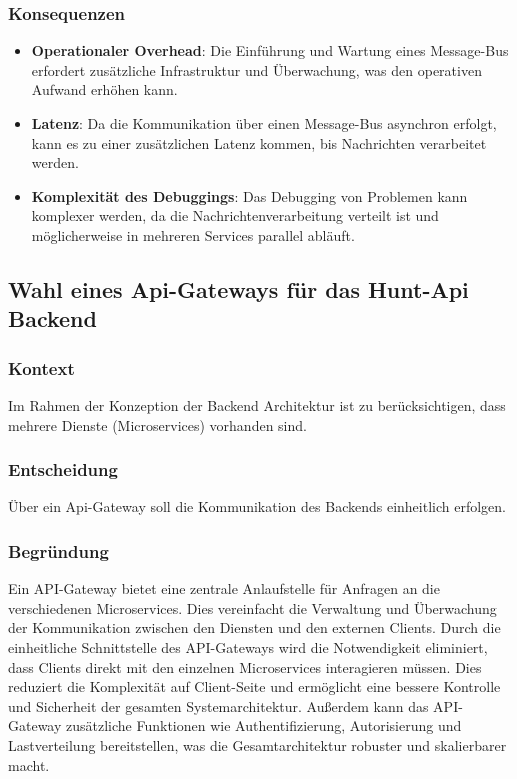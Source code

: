 \subsubsection{Konsequenzen}

\begin{itemize}
    \item \textbf{Operationaler Overhead}: Die Einführung und Wartung eines Message-Bus erfordert zusätzliche Infrastruktur und Überwachung, was den operativen Aufwand erhöhen kann.
    \item \textbf{Latenz}: Da die Kommunikation über einen Message-Bus asynchron erfolgt, kann es zu einer zusätzlichen Latenz kommen, bis Nachrichten verarbeitet werden.
    \item \textbf{Komplexität des Debuggings}: Das Debugging von Problemen kann komplexer werden, da die Nachrichtenverarbeitung verteilt ist und möglicherweise in mehreren Services parallel abläuft.
\end{itemize}

\subsection{Wahl eines Api-Gateways für das Hunt-Api Backend} \label{appendix:adr:proxy}

\subsubsection{Kontext}

Im Rahmen der Konzeption der Backend Architektur ist zu berücksichtigen, dass mehrere Dienste (Microservices) vorhanden sind.

\subsubsection{Entscheidung}

Über ein Api-Gateway soll die Kommunikation des Backends einheitlich erfolgen.

\subsubsection{Begründung}

Ein API-Gateway bietet eine zentrale Anlaufstelle für Anfragen an die verschiedenen Microservices. Dies vereinfacht die Verwaltung und Überwachung der Kommunikation zwischen den Diensten und den externen Clients. Durch die einheitliche Schnittstelle des API-Gateways wird die Notwendigkeit eliminiert, dass Clients direkt mit den einzelnen Microservices interagieren müssen. Dies reduziert die Komplexität auf Client-Seite und ermöglicht eine bessere Kontrolle und Sicherheit der gesamten Systemarchitektur. Außerdem kann das API-Gateway zusätzliche Funktionen wie Authentifizierung, Autorisierung und Lastverteilung bereitstellen, was die Gesamtarchitektur robuster und skalierbarer macht.

